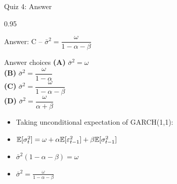 \documentclass[9pt, aspectratio=169, t]{beamer}
\begin{document}
\begin{frame}{Quiz 4: Answer}
    \begin{cminipage}{0.95\textwidth}
    {\small
    \begin{exampleblock}{Answer: C -- $\bar{\sigma}^2 = \dfrac{\omega}{1 - \alpha - \beta}$}

    \vspace{0.1cm}

    \begin{block}{Answer choices}
        \textcolor{MainBlue}{\textbf{(A)}} $\bar{\sigma}^2 = \omega$ \incorrect\\[2pt]
        \textcolor{MainBlue}{\textbf{(B)}} $\bar{\sigma}^2 = \dfrac{\omega}{1 - \alpha}$ \incorrect\\[2pt]
        \textcolor{MainBlue}{\textbf{(C)}} \textbf{\textcolor{Forest}{$\bar{\sigma}^2 = \dfrac{\omega}{1 - \alpha - \beta}$}} \correct\\[2pt]
        \textcolor{MainBlue}{\textbf{(D)}} $\bar{\sigma}^2 = \dfrac{\omega}{\alpha + \beta}$ \incorrect
    \end{block}

        \vspace{0.1cm}

        \begin{itemize}\setlength{\itemsep}{0pt}
            \item Taking unconditional expectation of GARCH(1,1):
            \item $\mathbb{E}[\sigma_t^2] = \omega + \alpha \mathbb{E}[\varepsilon_{t-1}^2] + \beta \mathbb{E}[\sigma_{t-1}^2]$
            \item $\bar{\sigma}^2 (1 - \alpha - \beta) = \omega$
            \item $\bar{\sigma}^2 = \frac{\omega}{1 - \alpha - \beta}$
        \end{itemize}
    \end{exampleblock}
    }

    \end{cminipage}
\end{frame}
\end{document}

